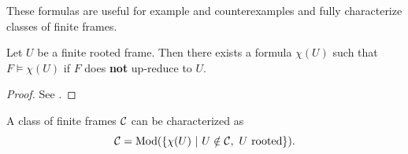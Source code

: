 These formulas are useful for example and counterexamples and fully characterize classes of finite frames.

\begin{theorem}
    Let $U$ be a finite rooted frame. Then there exists a formula $\chi(U)$ such that $F\models\chi(U)$ if $F$ does \textbf{not} up-reduce to $U$.
\end{theorem}
\begin{proof}
    See \cite{Bezhanishvili2022}.%
\end{proof}
\begin{corollary}
    A class of finite frames $\operatorname{\mathcal{C}}$ can be characterized as
    \[\C=\Mod(\set{\chi(U)\ |\ U\notin \C,\ U \text{ rooted}}).\]
\end{corollary}

